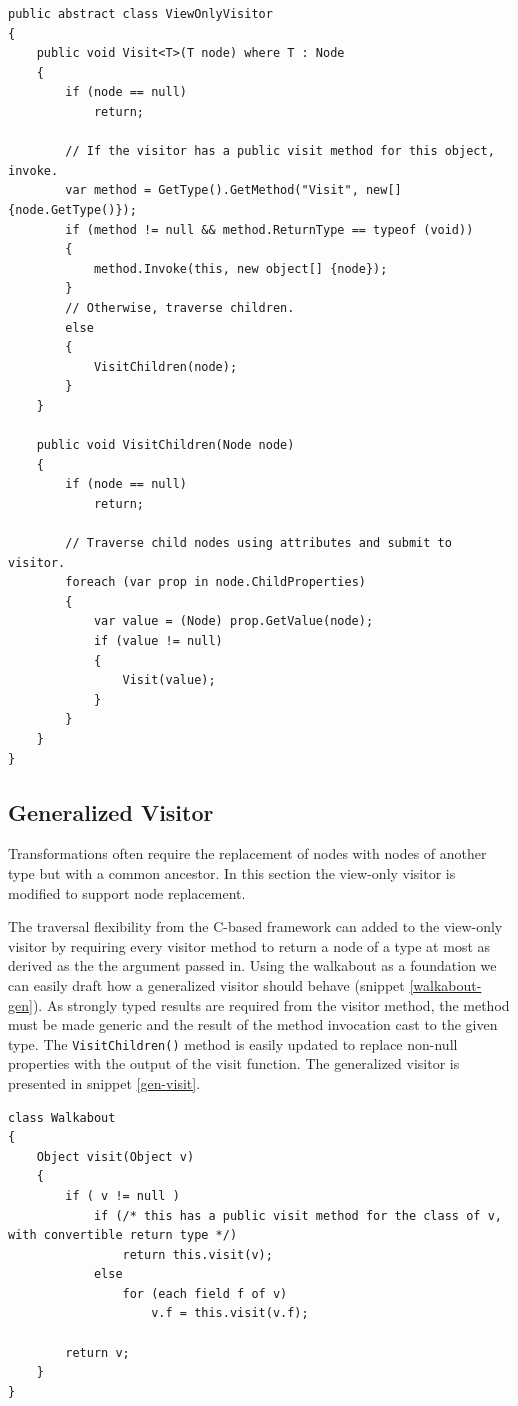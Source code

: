 \documentclass[twoside,openright]{uva-bachelor-thesis}
\newcommand{\code}[1]{\texttt{\footnotesize#1}}
\begin{document}
			\begin{lstlisting}[caption=Read-only visitor,label=readonly]
public abstract class ViewOnlyVisitor
{
	public void Visit<T>(T node) where T : Node
	{
		if (node == null)
			return;
	
		// If the visitor has a public visit method for this object, invoke.
		var method = GetType().GetMethod("Visit", new[] {node.GetType()});
		if (method != null && method.ReturnType == typeof (void))
		{
			method.Invoke(this, new object[] {node});
		}
		// Otherwise, traverse children.
		else
		{
			VisitChildren(node);
		}
	}
	
	public void VisitChildren(Node node)
	{
		if (node == null)
			return;
	
		// Traverse child nodes using attributes and submit to visitor.
		foreach (var prop in node.ChildProperties)
		{
			var value = (Node) prop.GetValue(node);
			if (value != null)
			{
				Visit(value);
			}
		}
	}
}
			\end{lstlisting}
		
		\subsection{Generalized Visitor}
			Transformations often require the replacement of nodes with nodes of another type but with a common ancestor. In this section the view-only visitor is modified to support node replacement.
			
			The traversal flexibility from the C-based framework can added to the view-only visitor by requiring every visitor method to return a node of a type at most as derived as the the argument passed in. Using the walkabout as a foundation we can easily draft how a generalized visitor should behave (snippet \ref{walkabout-gen}). As strongly typed results are required from the visitor method, the method must be made generic and the result of the method invocation cast to the given type. The \code{VisitChildren()} method is easily updated to replace non-null properties with the output of the  visit function. The generalized visitor is presented in snippet \ref{gen-visit}.
			
			\begin{lstlisting}[caption=Walkabout with return values,label=walkabout-gen]
class Walkabout
{
	Object visit(Object v)
	{
		if ( v != null )
			if (/* this has a public visit method for the class of v, with convertible return type */)
				return this.visit(v);
			else
				for (each field f of v)
					v.f = this.visit(v.f);
		
		return v;
	}
}
			\end{lstlisting}
			
\end{document}
